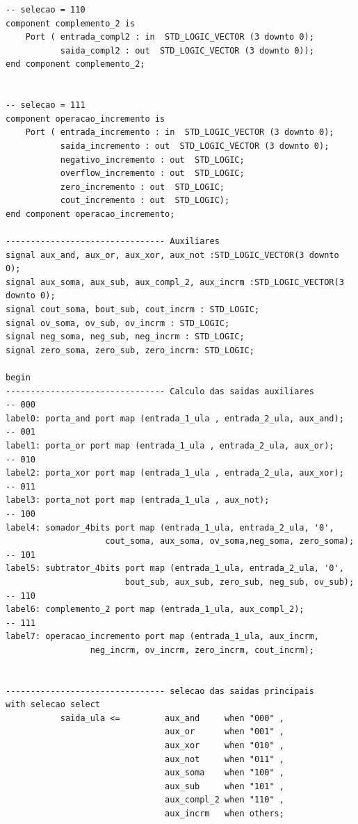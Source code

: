 \documentclass[a4paper,12pt,twoside]{article}
\begin{document}
\begin{lstlisting}
-- selecao = 110
component complemento_2 is
    Port ( entrada_compl2 : in  STD_LOGIC_VECTOR (3 downto 0);
           saida_compl2 : out  STD_LOGIC_VECTOR (3 downto 0));
end component complemento_2;


-- selecao = 111
component operacao_incremento is
    Port ( entrada_incremento : in  STD_LOGIC_VECTOR (3 downto 0);
           saida_incremento : out  STD_LOGIC_VECTOR (3 downto 0);
           negativo_incremento : out  STD_LOGIC;
           overflow_incremento : out  STD_LOGIC;
           zero_incremento : out  STD_LOGIC;
           cout_incremento : out  STD_LOGIC);
end component operacao_incremento;

-------------------------------- Auxiliares
signal aux_and, aux_or, aux_xor, aux_not :STD_LOGIC_VECTOR(3 downto 0);
signal aux_soma, aux_sub, aux_compl_2, aux_incrm :STD_LOGIC_VECTOR(3 downto 0);
signal cout_soma, bout_sub, cout_incrm : STD_LOGIC;
signal ov_soma, ov_sub, ov_incrm : STD_LOGIC;
signal neg_soma, neg_sub, neg_incrm : STD_LOGIC;
signal zero_soma, zero_sub, zero_incrm: STD_LOGIC;

begin
-------------------------------- Calculo das saidas auxiliares
-- 000
label0: porta_and port map (entrada_1_ula , entrada_2_ula, aux_and);
-- 001
label1: porta_or port map (entrada_1_ula , entrada_2_ula, aux_or);
-- 010
label2: porta_xor port map (entrada_1_ula , entrada_2_ula, aux_xor);
-- 011
label3: porta_not port map (entrada_1_ula , aux_not);
-- 100
label4: somador_4bits port map (entrada_1_ula, entrada_2_ula, '0', 
                    cout_soma, aux_soma, ov_soma,neg_soma, zero_soma);
-- 101
label5: subtrator_4bits port map (entrada_1_ula, entrada_2_ula, '0', 
                        bout_sub, aux_sub, zero_sub, neg_sub, ov_sub);
-- 110
label6: complemento_2 port map (entrada_1_ula, aux_compl_2);
-- 111
label7: operacao_incremento port map (entrada_1_ula, aux_incrm,
                 neg_incrm, ov_incrm, zero_incrm, cout_incrm);
							

-------------------------------- selecao das saidas principais
with selecao select
           saida_ula <=         aux_and     when "000" ,
                                aux_or      when "001" ,
                                aux_xor     when "010" ,
                                aux_not	    when "011" ,
                                aux_soma    when "100" ,
                                aux_sub	    when "101" ,
                                aux_compl_2 when "110" ,
                                aux_incrm   when others;
		

\end{lstlisting}
\end{document}
